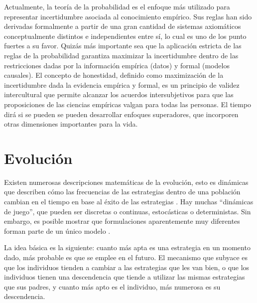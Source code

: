 \documentclass[a4paper,10pt]{article}
\begin{document}
Actualmente, la teoría de la probabilidad es el enfoque más utilizado para representar incertidumbre asociada al conocimiento empírico.
Sus reglas han sido derivadas formalmente a partir de una gran cantidad de sistemas axiomáticos conceptualmente distintos e independientes entre sí, lo cual es uno de los punto fuertes a su favor.
Quizás más importante sea que la aplicación estricta de las reglas de la probabilidad garantiza maximizar la incertidumbre dentro de las restricciones dadas por la información empírica (datos) y formal (modelos causales).
El concepto de honestidad, definido como maximización de la incertidumbre dada la evidencia empírica y formal, es un principio de validez intercultural que permite alcanzar los acuerdos intersubjetivos para que las proposiciones de las ciencias empíricas valgan para todas las personas.
El tiempo dirá si se pueden se pueden desarrollar enfoques superadores, que incorporen otras dimensiones importantes para la vida.

\section{Evolución}

Existen numerosas descripciones matemáticas de la evolución, esto es dinámicas que describen cómo las frecuencias de las estrategias dentro de una población cambian en el tiempo en base al éxito de las estrategias \cite{hofbauer2003-evolutionaryGameDynamics}.
Hay muchas ``dinámicas de juego'', que pueden ser discretas o continuas, estocásticas o deterministas.
Sin embargo, es posible mostrar que formulaciones aparentemente muy diferentes forman parte de un único modelo \cite{taylor1978-replicatorDynamic, schuster1983-replicatorDynamics}.

La idea básica es la siguiente: cuanto más apta es una estrategia en un momento dado, más probable es que se emplee en el futuro.
El mecanismo que subyace es que los individuos tienden a cambiar a las estrategias que les van bien, o que los individuos tienen una descendencia que tiende a utilizar las mismas estrategias que sus padres, y cuanto más apto es el individuo, más numerosa es su descendencia.
\end{document}
